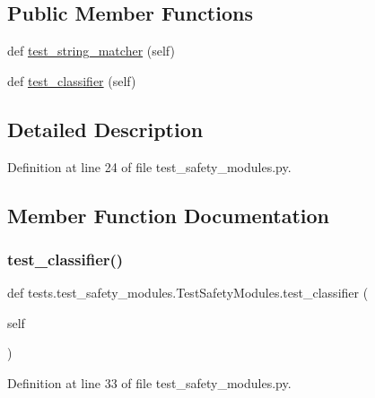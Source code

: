 \subsection*{Public Member Functions}
\begin{DoxyCompactItemize}
\item 
def \hyperlink{classtests_1_1test__safety__modules_1_1TestSafetyModules_aed1e2df090eb0fd87202030400adf2a3}{test\+\_\+string\+\_\+matcher} (self)
\item 
def \hyperlink{classtests_1_1test__safety__modules_1_1TestSafetyModules_ad45ef11e72f311a61895e97b60299b12}{test\+\_\+classifier} (self)
\end{DoxyCompactItemize}


\subsection{Detailed Description}


Definition at line 24 of file test\+\_\+safety\+\_\+modules.\+py.



\subsection{Member Function Documentation}
\mbox{\label{classtests_1_1test__safety__modules_1_1TestSafetyModules_ad45ef11e72f311a61895e97b60299b12}} 
\subsubsection{\texorpdfstring{test\+\_\+classifier()}{test\_classifier()}}
{\footnotesize\ttfamily def tests.\+test\+\_\+safety\+\_\+modules.\+Test\+Safety\+Modules.\+test\+\_\+classifier (\begin{DoxyParamCaption}\item[{}]{self }\end{DoxyParamCaption})}



Definition at line 33 of file test\+\_\+safety\+\_\+modules.\+py.


